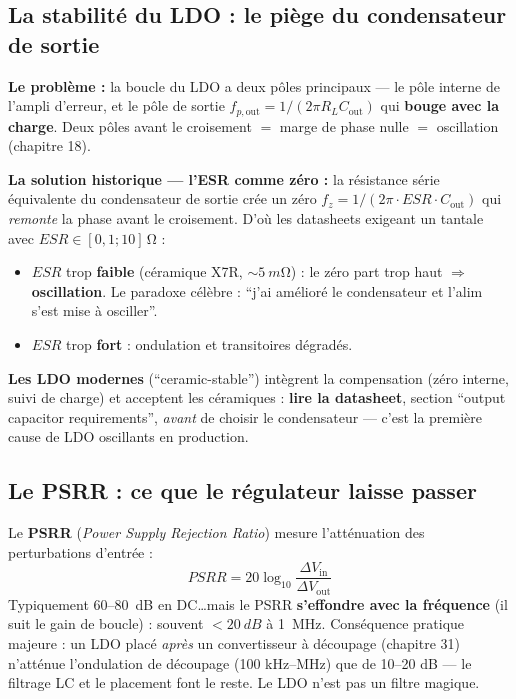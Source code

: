 \documentclass[12pt,a4paper,twoside]{book}
\begin{document}
\subsection{La stabilité du LDO : le piège du condensateur de sortie}

\begin{attention}
\textbf{Le problème :} la boucle du LDO a deux pôles principaux --- le pôle interne de l'ampli d'erreur, et le pôle de sortie $f_{p,\text{out}} = 1/(2\pi R_L C_{\text{out}})$ qui \textbf{bouge avec la charge}. Deux pôles avant le croisement $=$ marge de phase nulle $=$ oscillation (chapitre 18).

\textbf{La solution historique --- l'ESR comme zéro :} la résistance série équivalente du condensateur de sortie crée un zéro $f_z = 1/(2\pi \cdot ESR \cdot C_{\text{out}})$ qui \textit{remonte} la phase avant le croisement. D'où les datasheets exigeant un tantale avec $ESR \in [0{,}1 ; 10]\,\si{\ohm}$ :
\begin{itemize}[nosep]
\item $ESR$ trop \textbf{faible} (céramique X7R, $\sim\SI{5}{m\ohm}$) : le zéro part trop haut $\Rightarrow$ \textbf{oscillation}. Le paradoxe célèbre : ``j'ai amélioré le condensateur et l'alim s'est mise à osciller''.
\item $ESR$ trop \textbf{fort} : ondulation et transitoires dégradés.
\end{itemize}
\textbf{Les LDO modernes} (``ceramic-stable'') intègrent la compensation (zéro interne, suivi de charge) et acceptent les céramiques : \textbf{lire la datasheet}, section ``output capacitor requirements'', \textit{avant} de choisir le condensateur --- c'est la première cause de LDO oscillants en production.
\end{attention}

\subsection{Le PSRR : ce que le régulateur laisse passer}

\begin{formule}
Le \textbf{PSRR} (\textit{Power Supply Rejection Ratio}) mesure l'atténuation des perturbations d'entrée :
\[
PSRR = 20\log_{10}\frac{\Delta V_{\text{in}}}{\Delta V_{\text{out}}}
\]
Typiquement \SI{60}{}--\SI{80}{dB} en DC\ldots mais le PSRR \textbf{s'effondre avec la fréquence} (il suit le gain de boucle) : souvent $< \SI{20}{dB}$ à \SI{1}{MHz}. Conséquence pratique majeure : un LDO placé \textit{après} un convertisseur à découpage (chapitre 31) n'atténue l'ondulation de découpage (100 kHz--MHz) que de 10--20 dB --- le filtrage LC et le placement font le reste. Le LDO n'est pas un filtre magique.
\end{formule}
\end{document}

